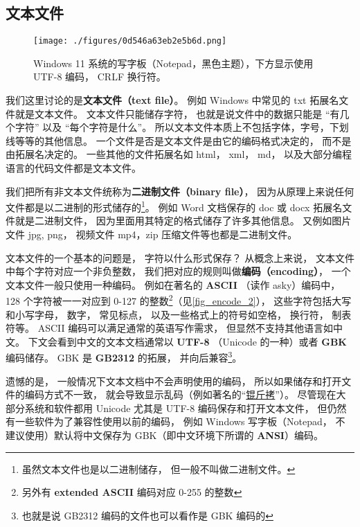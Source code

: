 
\subsection{文本文件}
\begin{figure}[ht]
\centering
\texttt{[image: ./figures/0d546a63eb2e5b6d.png]}
\caption{Windows 11 系统的写字板（Notepad，黑色主题），下方显示使用 UTF-8 编码， CRLF 换行符。} \label{fig_encode_3}
\end{figure}

我们这里讨论的是\textbf{文本文件（text file）}。 例如 Windows 中常见的 txt 拓展名文件就是文本文件。 文本文件只能储存字符， 也就是说文件中的数据只能是 “有几个字符” 以及 “每个字符是什么”。 所以文本文件本质上不包括字体，字号，下划线等等的其他信息。 一个文件是否是文本文件是由它的编码格式决定的， 而不是由拓展名决定的。 一些其他的文件拓展名如 html， xml， md， 以及大部分编程语言的代码文件都是文本文件。

我们把所有非文本文件统称为\textbf{二进制文件（binary file）}， 因为从原理上来说任何文件都是以二进制的形式储存的\footnote{虽然文本文件也是以二进制储存， 但一般不叫做二进制文件。}。 例如 Word 文档保存的 doc 或 docx 拓展名文件就是二进制文件， 因为里面用其特定的格式储存了许多其他信息。  又例如图片文件 jpg, png， 视频文件 mp4，zip 压缩文件等也都是二进制文件。

文本文件的一个基本的问题是， 字符以什么形式保存？ 从概念上来说， 文本文件中每个字符对应一个非负整数， 我们把对应的规则叫做\textbf{编码（encoding）}， 一个文本文件一般只使用一种编码。 例如在著名的 \textbf{ASCII} （读作 asky）编码中， 128 个字符被一一对应到 0-127 的整数\footnote{另外有 \textbf{extended ASCII} 编码对应 0-255 的整数}（见\autoref{fig_encode_2}）， 这些字符包括大写和小写字母， 数字， 常见标点， 以及一些格式上的符号如空格， 换行符， 制表符等。 ASCII 编码可以满足通常的英语写作需求， 但显然不支持其他语言如中文。 下文会看到中文的文本文档通常以 \textbf{UTF-8} （Unicode 的一种）或者 \textbf{GBK} 编码储存。 GBK 是 \textbf{GB2312} 的拓展， 并向后兼容\footnote{也就是说 GB2312 编码的文件也可以看作是 GBK 编码的}。

遗憾的是， 一般情况下文本文档中不会声明使用的编码， 所以如果储存和打开文件的编码方式不一致， 就会导致显示乱码（例如著名的“\href{https://baike.baidu.com/item/\%E9\%94\%9F\%E6\%96\%A4\%E6\%8B\%B7}{锟斤拷}”）。 尽管现在大部分系统和软件都用 Unicode 尤其是 UTF-8 编码保存和打开文本文件， 但仍然有一些软件为了兼容性使用以前的编码， 例如 Windows 写字板（Notepad， 不建议使用）默认将中文保存为 GBK（即中文环境下所谓的 \textbf{ANSI}）编码。

